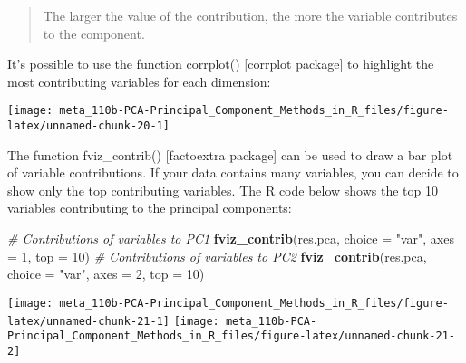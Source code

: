 \documentclass[]{book}
\newenvironment{Shaded}{\begin{snugshade}}{\end{snugshade}}
\newcommand{\CommentTok}[1]{\textcolor[rgb]{0.56,0.35,0.01}{\textit{#1}}}
\newcommand{\DataTypeTok}[1]{\textcolor[rgb]{0.13,0.29,0.53}{#1}}
\newcommand{\DecValTok}[1]{\textcolor[rgb]{0.00,0.00,0.81}{#1}}
\newcommand{\KeywordTok}[1]{\textcolor[rgb]{0.13,0.29,0.53}{\textbf{#1}}}
\newcommand{\NormalTok}[1]{#1}
\newcommand{\OperatorTok}[1]{\textcolor[rgb]{0.81,0.36,0.00}{\textbf{#1}}}
\newcommand{\OtherTok}[1]{\textcolor[rgb]{0.56,0.35,0.01}{#1}}
\newcommand{\StringTok}[1]{\textcolor[rgb]{0.31,0.60,0.02}{#1}}
\begin{document}
\begin{quote}
The larger the value of the contribution, the more the variable contributes to the component.
\end{quote}

It's possible to use the function corrplot() {[}corrplot package{]} to highlight the most contributing variables for each dimension:

\begin{Shaded}
\end{Shaded}

\begin{center}\texttt{[image: meta\_110b-PCA-Principal\_Component\_Methods\_in\_R\_files/figure-latex/unnamed-chunk-20-1]} \end{center}

The function fviz\_contrib() {[}factoextra package{]} can be used to draw a bar plot of variable contributions. If your data contains many variables, you can decide to show only the top contributing variables. The R code below shows the top 10 variables contributing to the principal components:

\begin{Shaded}
\begin{Highlighting}[]
\CommentTok{# Contributions of variables to PC1}
\KeywordTok{fviz_contrib}\NormalTok{(res.pca, }\DataTypeTok{choice =} \StringTok{"var"}\NormalTok{, }\DataTypeTok{axes =} \DecValTok{1}\NormalTok{, }\DataTypeTok{top =} \DecValTok{10}\NormalTok{)}
\CommentTok{# Contributions of variables to PC2}
\KeywordTok{fviz_contrib}\NormalTok{(res.pca, }\DataTypeTok{choice =} \StringTok{"var"}\NormalTok{, }\DataTypeTok{axes =} \DecValTok{2}\NormalTok{, }\DataTypeTok{top =} \DecValTok{10}\NormalTok{)}
\end{Highlighting}
\end{Shaded}

\begin{center}\texttt{[image: meta\_110b-PCA-Principal\_Component\_Methods\_in\_R\_files/figure-latex/unnamed-chunk-21-1]} \texttt{[image: meta\_110b-PCA-Principal\_Component\_Methods\_in\_R\_files/figure-latex/unnamed-chunk-21-2]} \end{center}
\end{document}
